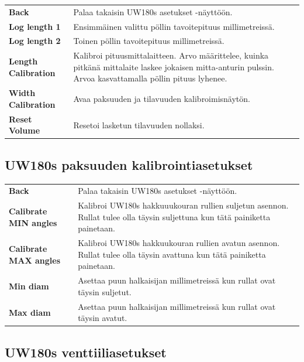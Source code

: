 \documentclass[12pt,a4paper,finnish]{uvmanual}
\begin{document}
\begin{tabular}{ L{0.2\textwidth} L{0.66\textwidth} }
\textbf{Back} & Palaa takaisin UW180s asetukset -näyttöön. \\
\textbf{Log length 1} & Ensimmäinen valittu pöllin tavoitepituus millimetreissä. \\
\textbf{Log length 2} & Toinen pöllin tavoitepituus millimetreissä. \\
\textbf{Length Calibration} & Kalibroi pituusmittalaitteen. Arvo määrittelee, kuinka pitkänä mittalaite laskee jokaisen mitta-anturin pulssin. Arvoa kasvattamalla pöllin pituus lyhenee. \\
\textbf{Width Calibration} & Avaa paksuuden ja tilavuuden kalibroimisnäytön. \\
\textbf{Reset Volume} & Resetoi lasketun tilavuuden nollaksi. \\
\end{tabular}

\FloatBarrier
\subsection{UW180s paksuuden kalibrointiasetukset}\label{ch:settings_uw180s_width}


\begin{tabular}{ L{0.2\textwidth} L{0.66\textwidth} }
\textbf{Back} & Palaa takaisin UW180s asetukset -näyttöön. \\
\textbf{Calibrate MIN angles} & Kalibroi UW180s hakkuuukouran rullien suljetun asennon. Rullat tulee olla täysin suljettuna kun tätä painiketta painetaan. \\
\textbf{Calibrate MAX angles} & Kalibroi UW180s hakkuukouran rullien avatun asennon. Rullat tulee olla täysin avattuna kun tätä painiketta painetaan. \\
\textbf{Min diam} & Asettaa puun halkaisijan millimetreissä kun rullat ovat täysin suljetut. \\
\textbf{Max diam} & Asettaa puun halkaisijan millimetreissä kun rullat ovat täysin avatut. \\
\end{tabular}

\FloatBarrier
\subsection{UW180s venttiiliasetukset}\label{ch:settings_uw180s_valves}
\end{document}
